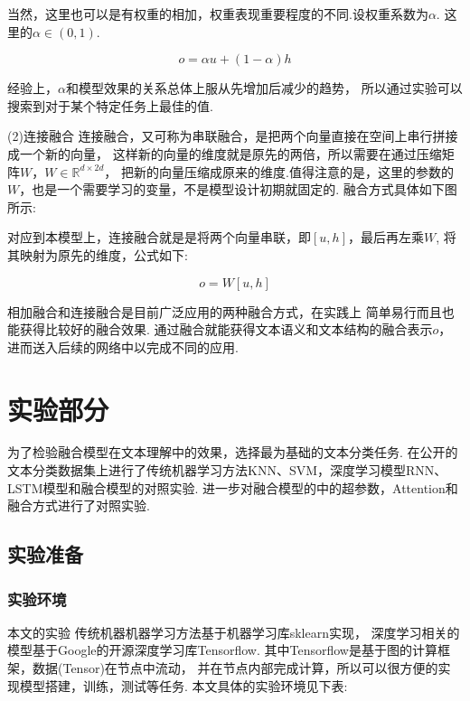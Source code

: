 \documentclass[bachelor,adobefonts]{jnuthesis}
\begin{document}
当然，这里也可以是有权重的相加，权重表现重要程度的不同.设权重系数为$\alpha$.
这里的$\alpha \in (0,1)$.

\begin{equation}
  o = \alpha u + (1-\alpha)h
\end{equation}

经验上，$\alpha$和模型效果的关系总体上服从先增加后减少的趋势，
所以通过实验可以搜索到对于某个特定任务上最佳的值.

(2)连接融合
连接融合，又可称为串联融合，是把两个向量直接在空间上串行拼接成一个新的向量，
这样新的向量的维度就是原先的两倍，所以需要在通过压缩矩阵$W$，$W \in \mathbb{R}^{d \times 2d}$，
把新的向量压缩成原来的维度.值得注意的是，这里的参数的$W$，也是一个需要学习的变量，不是模型设计初期就固定的.
融合方式具体如下图所示:

对应到本模型上，连接融合就是是将两个向量串联，即$[u,h]$，最后再左乘$W$,
将其映射为原先的维度，公式如下:

\begin{equation}
  o = W[u,h]
\end{equation}

相加融合和连接融合是目前广泛应用的两种融合方式，在实践上
简单易行而且也能获得比较好的融合效果.
通过融合就能获得文本语义和文本结构的融合表示$o$，进而送入后续的网络中以完成不同的应用.


\chapter{实验部分}
为了检验融合模型在文本理解中的效果，选择最为基础的文本分类任务.
在公开的文本分类数据集上进行了传统机器学习方法KNN、SVM，深度学习模型RNN、LSTM模型和融合模型的对照实验.
进一步对融合模型的中的超参数，Attention和融合方式进行了对照实验.

\section{实验准备}
\subsection{实验环境}
本文的实验
传统机器机器学习方法基于机器学习库sklearn实现，
深度学习相关的模型基于Google的开源深度学习库Tensorflow.
其中Tensorflow是基于图的计算框架，数据(Tensor)在节点中流动，
并在节点内部完成计算，所以可以很方便的实现模型搭建，训练，测试等任务.
本文具体的实验环境见下表:
\end{document}
